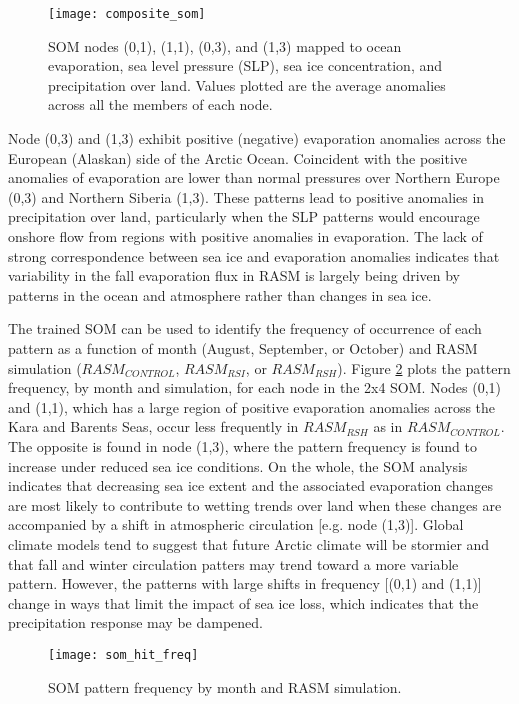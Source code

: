 \begin{figure}
  \centering
  \texttt{[image: composite\_som]}
  \caption{SOM nodes (0,1), (1,1), (0,3), and (1,3) mapped to ocean evaporation, sea level pressure (SLP), sea ice concentration, and precipitation over land. Values plotted are the average anomalies across all the members of each node.}
  \label{fig:composite_som}
\end{figure}

Node (0,3) and (1,3) exhibit positive (negative) evaporation anomalies across the European (Alaskan) side of the Arctic Ocean.
Coincident with the positive anomalies of evaporation are lower than normal pressures over Northern Europe (0,3) and Northern Siberia (1,3).
These patterns lead to positive anomalies in precipitation over land, particularly when the SLP patterns would encourage onshore flow from regions with positive anomalies in evaporation.
The lack of strong correspondence between sea ice and evaporation anomalies indicates that variability in the fall evaporation flux in RASM is largely being driven by patterns in the ocean and atmosphere rather than changes in sea ice.

The trained SOM can be used to identify the frequency of occurrence of each pattern as a function of month (August, September, or October) and RASM simulation ($RASM_{CONTROL}$, $RASM_{RSI}$, or $RASM_{RSH}$).
Figure \ref{fig:som_hit_freq} plots the pattern frequency, by month and simulation, for each node in the 2x4 SOM.
Nodes (0,1) and (1,1), which has a large region of positive evaporation anomalies across the Kara and Barents Seas, occur less frequently in $RASM_{RSH}$ as in $RASM_{CONTROL}$.
The opposite is found in node (1,3), where the pattern frequency is found to increase under reduced sea ice conditions.
On the whole, the SOM analysis indicates that decreasing sea ice extent and the associated evaporation changes are most likely to contribute to wetting trends over land when these changes are accompanied by a shift in atmospheric circulation [e.g. node (1,3)].
Global climate models tend to suggest that future Arctic climate will be stormier \citep{Vavrus_2012} and that fall and winter circulation patters may trend toward a more variable pattern.
However, the patterns with large shifts in frequency [(0,1) and (1,1)] change in ways that limit the impact of sea ice loss, which indicates that the precipitation response may be dampened.

\begin{figure}
  \centering
  \texttt{[image: som\_hit\_freq]}
  \caption{SOM pattern frequency by month and RASM simulation.}
  \label{fig:som_hit_freq}
\end{figure}

